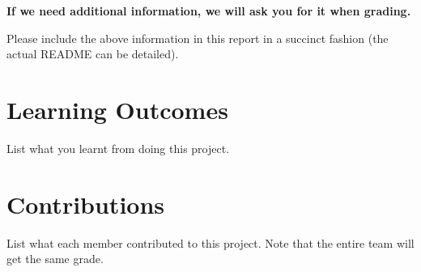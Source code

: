 \documentclass[11pt,a4paper]{article}
\begin{document}
\textbf{If we need additional information, we will ask you for it when grading.}

Please include the above information in this report in a succinct fashion (the actual README can be detailed).


\section{Learning Outcomes}
List what you learnt from doing this project. 

\section{Contributions}
List what each member contributed to this project. Note that the entire team will get the same grade.
\end{document}

